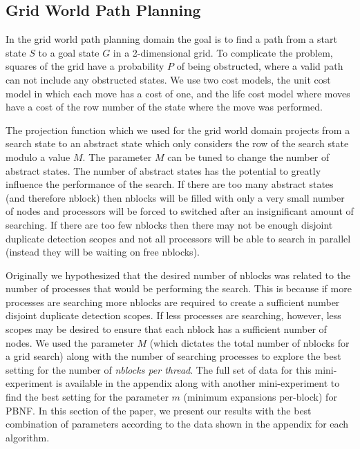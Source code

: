 \documentclass{article}
\begin{document}

\subsection{Grid World Path Planning}

In the grid world path planning domain the goal is to find a path from
a start state $S$ to a goal state $G$ in a 2-dimensional grid.  To
complicate the problem, squares of the grid have a probability $P$ of
being obstructed, where a valid path can not include any obstructed
states.  We use two cost models, the unit cost model in which each
move has a cost of one, and the life cost model where moves have a
cost of the row number of the state where the move was performed.

The projection function which we used for the grid world domain
projects from a search state to an abstract state which only considers
the row of the search state modulo a value $M$.  The parameter $M$ can
be tuned to change the number of abstract states.  The number of
abstract states has the potential to greatly influence the performance
of the search.  If there are too many abstract states (and therefore
nblock) then nblocks will be filled with only a very small number of
nodes and processors will be forced to switched after an insignificant
amount of searching.  If there are too few nblocks then there may not
be enough disjoint duplicate detection scopes and not all processors
will be able to search in parallel (instead they will be waiting on
free nblocks).

Originally we hypothesized that the desired number of nblocks was
related to the number of processes that would be performing the
search.  This is because if more processes are searching more nblocks
are required to create a sufficient number disjoint duplicate
detection scopes.  If less processes are searching, however, less
scopes may be desired to ensure that each nblock has a sufficient
number of nodes.  We used the parameter $M$ (which dictates the total
number of nblocks for a grid search) along with the number of
searching processes to explore the best setting for the number of
\emph{nblocks per thread}.  The full set of data for this
mini-experiment is available in the appendix along with another
mini-experiment to find the best setting for the parameter $m$
(minimum expansions per-block) for PBNF.  In this section of the
paper, we present our results with the best combination of parameters
according to the data shown in the appendix for each algorithm.
\end{document}

